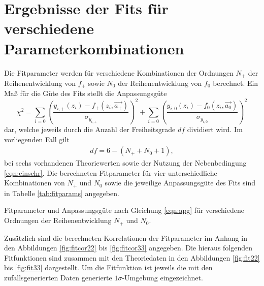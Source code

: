 \section{Ergebnisse der Fits für verschiedene Parameterkombinationen}
\label{sec:fits}

Die Fitparameter werden für verschiedene Kombinationen der Ordnungen $N_+$ der Reihenentwicklung von $f_+$ sowie $N_0$ der Reihenentwicklung von $f_0$ berechnet.
Ein Maß für die Güte des Fits stellt die Anpassungsgüte 
\begin{equation}
  \label{eqn:apg}
  \chi^2 = \sum_{i=0}^{} \left( \frac{y_{i,+}(z_i) - f_{+}(z_i, \vec{a_+})}{\sigma_{y_{i,+}}} \right)^2 + \sum_{i=0}^{} \left( \frac{y_{i,0}(z_i) - f_{0}(z_i, \vec{a_0})}{\sigma_{y_{i,0}}}  \right)^2
\end{equation}
dar, welche jeweils durch die Anzahl der Freiheitsgrade $df$ dividiert wird.
Im vorliegenden Fall gilt
\begin{align*}
  df = 6 - (N_+ + N_0 + 1),
\end{align*}
bei sechs vorhandenen Theoriewerten sowie der Nutzung der Nebenbedingung \eqref{eqn:einschr}.
Die berechneten Fitparameter für vier unterschiedliche Kombinationen von $N_+$ und $N_0$ sowie die jeweilige Anpassungsgüte des Fits sind in Tabelle \ref{tab:fitparams} angegeben.
\begin{table}
  \centering
  \caption{Fitparameter und Anpassungsgüte nach Gleichung \eqref{eqn:apg} für verschiedene Ordnungen der Reihenentwicklung $N_+$ und $N_0$.}
  \begin{subtable}{0.48\textwidth}
    \centering
    
  \end{subtable}
  \begin{subtable}{0.48\textwidth}
    \centering
    
  \end{subtable}
  \begin{subtable}[t]{0.48\textwidth}
    \vspace{15px}
    \centering
    
  \end{subtable}
  \begin{subtable}[t]{0.48\textwidth}
    \vspace{15px}
    \centering
    
  \end{subtable}
  \vspace{10px}
  \label{tab:fitparams}
\end{table}
Zusätzlich sind die berechneten Korrelationen der Fitparameter im Anhang in den Abbildungen \ref{fig:fitcor22} bis \ref{fig:fitcor33} angegeben.
Die hieraus folgenden Fitfunktionen sind zusammen mit den Theoriedaten in den Abbildungen \ref{fig:fit22} bis \ref{fig:fit33} dargestellt.
Um die Fitfunktion ist jeweils die mit den zufallsgenerierten Daten generierte $\num{1}\sigma$-Umgebung eingezeichnet.

